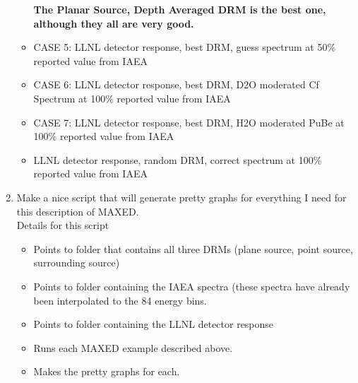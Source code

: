 \documentclass[11pt]{article}
\begin{document}
\begin{enumerate}
\begin{itemize}
	\textbf{The Planar Source, Depth Averaged DRM is the best one, although they all are very good.}
	\item[\checkmark] CASE 5: LLNL detector response, best DRM, guess spectrum at 50\% reported value from IAEA
	\item[\checkmark] CASE 6: LLNL detector response, best DRM, D2O moderated Cf Spectrum at 100\% reported value from IAEA
	\item[\checkmark] CASE 7: LLNL detector response, best DRM, H2O moderated PuBe at 100\% reported value from IAEA
	\item[\checkmark] LLNL detector response, random DRM, correct spectrum at 100\% reported value from IAEA
	
	\end{itemize}
\item[\checkmark] Make a nice script that will generate pretty graphs for everything I need for this description of MAXED.\\
Details for this script
	\begin{itemize}
	\item Points to folder that contains all three DRMs (plane source, point source, surrounding source)
	\item Points to folder containing the IAEA spectra (these spectra have already been interpolated to the 84 energy bins.
	\item Points to folder containing the LLNL detector response
	\item Runs each MAXED example described above.
	\item Makes the pretty graphs for each.
	\end{itemize}

\end{enumerate}
\break

   
   
\end{document}
